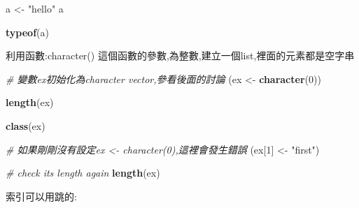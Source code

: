 \documentclass[]{book}
\newenvironment{Shaded}{\begin{snugshade}}{\end{snugshade}}
\newcommand{\CommentTok}[1]{\textcolor[rgb]{0.56,0.35,0.01}{\textit{#1}}}
\newcommand{\DecValTok}[1]{\textcolor[rgb]{0.00,0.00,0.81}{#1}}
\newcommand{\KeywordTok}[1]{\textcolor[rgb]{0.13,0.29,0.53}{\textbf{#1}}}
\newcommand{\NormalTok}[1]{#1}
\newcommand{\StringTok}[1]{\textcolor[rgb]{0.31,0.60,0.02}{#1}}
\theoremstyle{definition}
\theoremstyle{definition}
\theoremstyle{definition}
\theoremstyle{remark}
\begin{document}
\begin{Shaded}
\begin{Highlighting}[]
\NormalTok{a <-}\StringTok{ "hello"}
\NormalTok{a}
\end{Highlighting}
\end{Shaded}

\begin{Shaded}
\begin{Highlighting}[]
\KeywordTok{typeof}\NormalTok{(a)}
\end{Highlighting}
\end{Shaded}

利用函數:character()
這個函數的參數,為整數,建立一個list,裡面的元素都是空字串

\begin{Shaded}
\begin{Highlighting}[]
\CommentTok{# 變數ex初始化為character vector,參看後面的討論}
\NormalTok{(ex <-}\StringTok{ }\KeywordTok{character}\NormalTok{(}\DecValTok{0}\NormalTok{))}
\end{Highlighting}
\end{Shaded}

\begin{Shaded}
\begin{Highlighting}[]
\KeywordTok{length}\NormalTok{(ex)}
\end{Highlighting}
\end{Shaded}

\begin{Shaded}
\begin{Highlighting}[]
\KeywordTok{class}\NormalTok{(ex)}
\end{Highlighting}
\end{Shaded}

\begin{Shaded}
\begin{Highlighting}[]
\CommentTok{# 如果剛剛沒有設定ex <- character(0),這裡會發生錯誤}
\NormalTok{(ex[}\DecValTok{1}\NormalTok{] <-}\StringTok{ "first"}\NormalTok{)}
\end{Highlighting}
\end{Shaded}

\begin{Shaded}
\begin{Highlighting}[]
\CommentTok{# check its length again}
\KeywordTok{length}\NormalTok{(ex)}
\end{Highlighting}
\end{Shaded}

索引可以用跳的:
\end{document}
